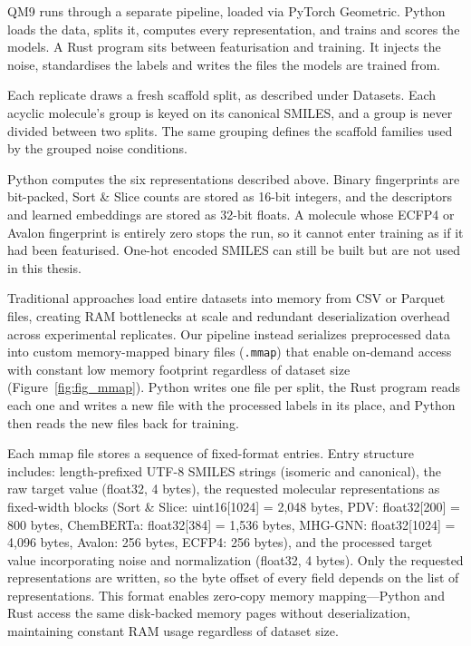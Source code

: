 QM9 \citep{Ramakrishnan2014} runs through a separate pipeline, loaded via PyTorch Geometric. Python
loads the data, splits it, computes every representation, and trains and scores the models. A Rust
program sits between featurisation and training. It injects the noise, standardises the labels and
writes the files the models are trained from.

Each replicate draws a fresh scaffold split, as described under Datasets. Each acyclic molecule's
group is keyed on its canonical SMILES, and a group is never divided between two splits. The same
grouping defines the scaffold families used by the grouped noise conditions.

Python computes the six representations described above. Binary fingerprints are bit-packed, Sort \&
Slice counts are stored as 16-bit integers, and the descriptors and learned embeddings are stored
as 32-bit floats. A molecule whose ECFP4 or Avalon fingerprint is entirely zero stops the run, so it
cannot enter training as if it had been featurised. One-hot encoded SMILES can still be built but
are not used in this thesis.

Traditional approaches load entire datasets into memory from CSV or Parquet files, creating RAM bottlenecks at scale and redundant deserialization overhead across experimental replicates. Our pipeline instead serializes preprocessed data into custom memory-mapped binary files (\texttt{.mmap}) that enable on-demand access with constant low memory footprint regardless of dataset size (Figure~\ref{fig:fig_mmap}). Python writes one file per split, the Rust program reads each one and writes a new file with the processed labels in its place, and Python then reads the new files back for training.

Each mmap file stores a sequence of fixed-format entries. Entry structure includes: length-prefixed UTF-8 SMILES strings (isomeric and canonical), the raw target value (float32, 4 bytes), the requested molecular representations as fixed-width blocks (Sort \& Slice: uint16[1024] = 2,048 bytes, PDV: float32[200] = 800 bytes, ChemBERTa: float32[384] = 1,536 bytes, MHG-GNN: float32[1024] = 4,096 bytes, Avalon: 256 bytes, ECFP4: 256 bytes), and the processed target value incorporating noise and normalization (float32, 4 bytes). Only the requested representations are written, so the byte offset of every field depends on the list of representations. This format enables zero-copy memory mapping—Python and Rust access the same disk-backed memory pages without deserialization, maintaining constant RAM usage regardless of dataset size.

